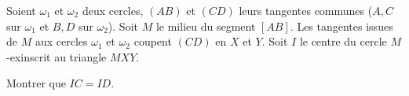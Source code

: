 Soient $\omega_1$ et $\omega_2$ deux cercles, $(AB)$ et $(CD)$ leurs tangentes communes ($A, C$ sur $\omega_1$ et $B, D$ sur $\omega_2$). Soit $M$ le milieu du segment $[AB]$. Les tangentes issues de $M$ aux cercles $\omega_1$ et $\omega_2$ coupent $(CD)$ en $X$ et $Y$. Soit $I$ le centre du cercle $M$-exinscrit au triangle $MXY$.

Montrer que $IC=ID$.